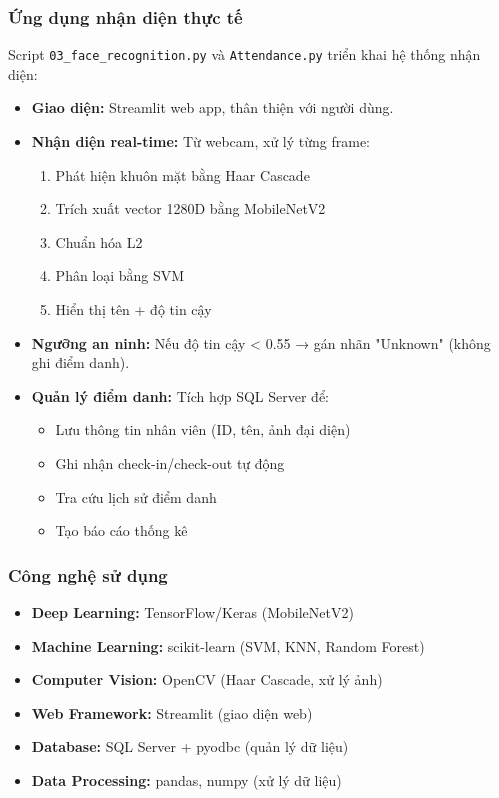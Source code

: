 \documentclass[a4paper]{book}
\begin{document}
\subsubsection{Ứng dụng nhận diện thực tế}
Script \texttt{03\_face\_recognition.py} và \texttt{Attendance.py} triển khai hệ thống nhận diện:

\begin{itemize}
    \item \textbf{Giao diện:} Streamlit web app, thân thiện với người dùng.
    \item \textbf{Nhận diện real-time:} Từ webcam, xử lý từng frame:
    \begin{enumerate}
        \item Phát hiện khuôn mặt bằng Haar Cascade
        \item Trích xuất vector 1280D bằng MobileNetV2
        \item Chuẩn hóa L2
        \item Phân loại bằng SVM
        \item Hiển thị tên + độ tin cậy
    \end{enumerate}
    
    \item \textbf{Ngưỡng an ninh:} Nếu độ tin cậy < 0.55 → gán nhãn "Unknown" (không ghi điểm danh).
    
    \item \textbf{Quản lý điểm danh:} Tích hợp SQL Server để:
    \begin{itemize}
        \item Lưu thông tin nhân viên (ID, tên, ảnh đại diện)
        \item Ghi nhận check-in/check-out tự động
        \item Tra cứu lịch sử điểm danh
        \item Tạo báo cáo thống kê
    \end{itemize}
\end{itemize}

\subsubsection{Công nghệ sử dụng}
\begin{itemize}
    \item \textbf{Deep Learning:} TensorFlow/Keras (MobileNetV2)
    \item \textbf{Machine Learning:} scikit-learn (SVM, KNN, Random Forest)
    \item \textbf{Computer Vision:} OpenCV (Haar Cascade, xử lý ảnh)
    \item \textbf{Web Framework:} Streamlit (giao diện web)
    \item \textbf{Database:} SQL Server + pyodbc (quản lý dữ liệu)
    \item \textbf{Data Processing:} pandas, numpy (xử lý dữ liệu)
\end{itemize}
\end{document}
